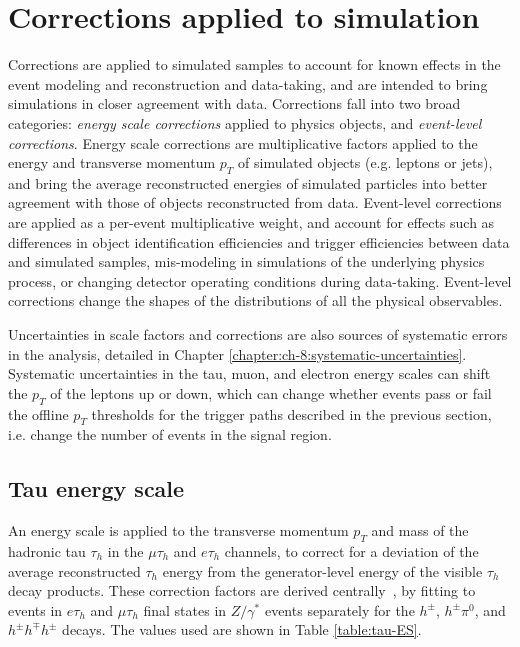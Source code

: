 \section{Corrections applied to simulation}
\label{sec:corrections_applied}

Corrections are applied to simulated samples to account for known effects in the event modeling and reconstruction and data-taking, and are intended to bring simulations in closer agreement with data. Corrections fall into two broad categories: \textit{energy scale corrections} applied to physics objects, and \textit{event-level corrections}. Energy scale corrections are multiplicative factors applied to the energy and transverse momentum $p_{T}$ of simulated objects (e.g. leptons or jets), and bring the average reconstructed energies of simulated particles into better agreement with those of objects reconstructed from data. Event-level corrections are applied as a per-event multiplicative weight, and account for effects such as differences in object identification efficiencies and trigger efficiencies between data and simulated samples, mis-modeling in simulations of the underlying physics process, or changing detector operating conditions during data-taking. Event-level corrections change the shapes of the distributions of all the physical observables.  

Uncertainties in scale factors and corrections are also sources of systematic errors in the analysis, detailed in Chapter \ref{chapter:ch-8:systematic-uncertainties}. Systematic uncertainties in the tau, muon, and electron energy scales can shift the $p_{T}$ of the leptons up or down, which can change whether events pass or fail the offline $p_{T}$ thresholds for the trigger paths described in the previous section, i.e. change the number of events in the signal region.  

\subsection{Tau energy scale}
\label{sec:tau_energy_scale}

An energy scale is applied to the transverse momentum $p_{T}$ and mass of the hadronic tau $\tau_{h}$ in the $\mu\tau_{h}$ and $e\tau_{h}$ channels, to correct for a deviation of the average reconstructed $\tau_{h}$ energy from the generator-level energy of the visible $\tau_{h}$ decay products. These correction factors are derived centrally~\cite{CMS-TAU-16-003}, by fitting to events in $e\tau_{h}$ and $\mu\tau_{h}$ final states in $Z/\gamma^*$ events separately for the $h^\pm$, $h^\pm \pi^0$, and $h^\pm h^\mp h^\pm$ decays. The values used are shown in Table \ref{table:tau-ES}.

